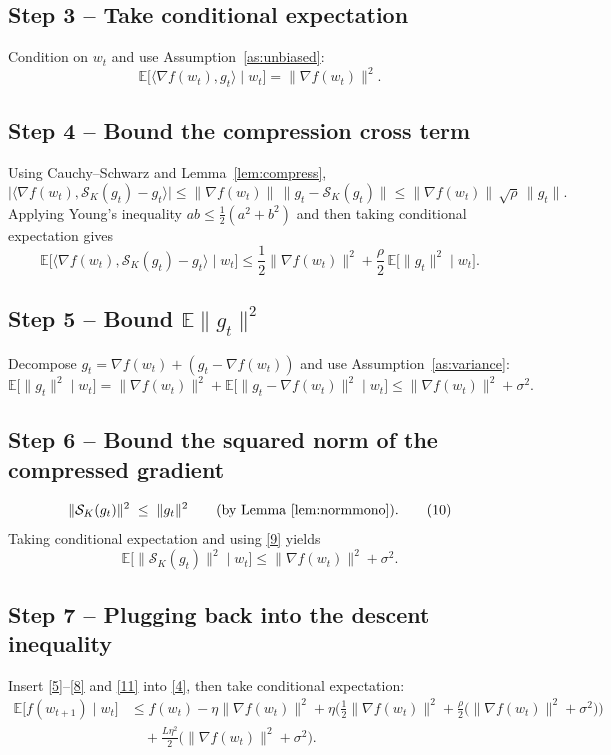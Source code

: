 \documentclass{article}
\newcommand{\topk}[1]{\mathcal{S}_K(#1)}
\begin{document}
\subsection*{Step 3 – Take conditional expectation}
Condition on $w_t$ and use Assumption~\ref{as:unbiased}:
\[
\mathbb{E}\big[\langle\nabla f(w_t),g_t\rangle\mid w_t\big]
=\|\nabla f(w_t)\|^{2}. \tag{6}
\]

\subsection*{Step 4 – Bound the compression cross term}
Using Cauchy–Schwarz and Lemma~\ref{lem:compress},
\[
\big|\langle\nabla f(w_t),\topk{g_t}-g_t\rangle\big|
\le\|\nabla f(w_t)\|\,\|g_t-\topk{g_t}\|
\le\|\nabla f(w_t)\|\,\sqrt{\rho}\,\|g_t\| . \tag{7}
\]
Applying Young’s inequality $ab\le\frac12(a^{2}+b^{2})$ and then taking conditional
expectation gives
\[
\mathbb{E}\big[\langle\nabla f(w_t),\topk{g_t}-g_t\rangle\mid w_t\big]
\le\frac12\|\nabla f(w_t)\|^{2}
+\frac{\rho}{2}\,\mathbb{E}\big[\|g_t\|^{2}\mid w_t\big]. \tag{8}
\]

\subsection*{Step 5 – Bound $\mathbb{E}\|g_t\|^{2}$}
Decompose $g_t=\nabla f(w_t)+(g_t-\nabla f(w_t))$ and use Assumption~\ref{as:variance}:
\[
\mathbb{E}\big[\|g_t\|^{2}\mid w_t\big]
= \|\nabla f(w_t)\|^{2}
+\mathbb{E}\big[\|g_t-\nabla f(w_t)\|^{2}\mid w_t\big]
\le \|\nabla f(w_t)\|^{2}+\sigma^{2}. \tag{9}
\]

\subsection*{Step 6 – Bound the squared norm of the compressed gradient}
\[
\|\topk{g_t}\|^{2}\;\le\;\|g_t\|^{2} \qquad\text{(by Lemma~\ref{lem:normmono})}. \tag{10}
\]
Taking conditional expectation and using \eqref{9} yields
\[
\mathbb{E}\big[\|\topk{g_t}\|^{2}\mid w_t\big]
\le \|\nabla f(w_t)\|^{2}+\sigma^{2}. \tag{11}
\]

\subsection*{Step 7 – Plugging back into the descent inequality}
Insert \eqref{5}–\eqref{8} and \eqref{11} into \eqref{4}, then take conditional expectation:
\[
\begin{aligned}
\mathbb{E}\big[f(w_{t+1})\mid w_t\big]
&\le f(w_t)-\eta\|\nabla f(w_t)\|^{2}
+\eta\Big(\frac12\|\nabla f(w_t)\|^{2}
+\frac{\rho}{2}\big(\|\nabla f(w_t)\|^{2}+\sigma^{2}\big)\Big) \\
&\quad+\frac{L\eta^{2}}{2}\big(\|\nabla f(w_t)\|^{2}+\sigma^{2}\big).
\end{aligned}
\tag{12}
\]
\end{document}
